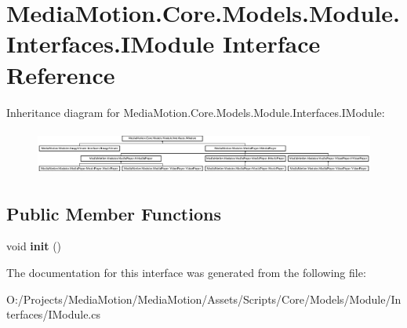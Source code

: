\hypertarget{interface_media_motion_1_1_core_1_1_models_1_1_module_1_1_interfaces_1_1_i_module}{\section{Media\+Motion.\+Core.\+Models.\+Module.\+Interfaces.\+I\+Module Interface Reference}
\label{interface_media_motion_1_1_core_1_1_models_1_1_module_1_1_interfaces_1_1_i_module}
}
Inheritance diagram for Media\+Motion.\+Core.\+Models.\+Module.\+Interfaces.\+I\+Module\+:\begin{figure}[H]
\begin{center}
\leavevmode
\includegraphics[height=1.497326cm]{interface_media_motion_1_1_core_1_1_models_1_1_module_1_1_interfaces_1_1_i_module}
\end{center}
\end{figure}
\subsection*{Public Member Functions}
\begin{DoxyCompactItemize}
\item 
\hypertarget{interface_media_motion_1_1_core_1_1_models_1_1_module_1_1_interfaces_1_1_i_module_a512dd79360075a410750ca49f12a452d}{void {\bfseries init} ()}\label{interface_media_motion_1_1_core_1_1_models_1_1_module_1_1_interfaces_1_1_i_module_a512dd79360075a410750ca49f12a452d}

\end{DoxyCompactItemize}


The documentation for this interface was generated from the following file\+:\begin{DoxyCompactItemize}
\item 
O\+:/\+Projects/\+Media\+Motion/\+Media\+Motion/\+Assets/\+Scripts/\+Core/\+Models/\+Module/\+Interfaces/I\+Module.\+cs\end{DoxyCompactItemize}
